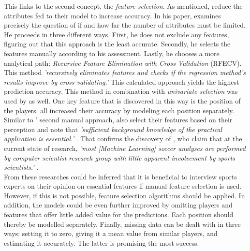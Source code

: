 \indent This links to the second concept, the \emph{feature selection}. As mentioned, \citet{deng_analysis_2020,egidi_bayesian_2018} reduce the attributes fed to their model to increase accuracy. In his paper, \citet{lutz_fantasy_2015} examines precisely the question of if and how far the number of attributes must be limited. He proceeds in three different ways. First, he does not exclude any features, figuring out that this approach is the least accurate. Secondly, he selects the features manually according to his assessment. Lastly, he chooses a more analytical path: \emph{Recursive Feature Elimination with Cross Validation} (RFECV). This method \emph{'recursively eliminates features and checks if the regression method's results improve by cross-validating.'} \parencite[, p. 4]{lutz_fantasy_2015} This calculated approach yields the highest prediction accuracy. This method in combination with \emph{univariate selection} was used by \citet{anik_players_2018} as well. One key feature that is discovered in this way is the position of the players. \citet{lutz_fantasy_2015,demediuk_performance_2021,egidi_bayesian_2018} all increased their accuracy by modeling each position separately. Similar to \citeauthor{lutz_fantasy_2015}' second manual approach, \citeauthor{deng_analysis_2020} also select their features based on their perception and note that \emph{'sufficient background knowledge of the practical application is essential.'} \parencite[, p. 4]{deng_analysis_2020}. That confirms the discovery of \citeauthor{rein_big_2016}, who claim that at the current state of research, \emph{'most [Machine Learning] soccer analyses are performed by computer scientist research group with little apparent involvement by sports scientists.'} \parencite[, p. 6]{rein_big_2016}. \\
\indent From these researches could be inferred that it is beneficial to interview sports experts on their opinion on essential features if manual feature selection is used. However, if this is not possible, feature selection algorithms should be applied. In addition, the models could be even further improved by omitting players and features that offer little added value for the predictions. Each position should thereby be modelled separately. Finally, missing data can be dealt with in three ways: setting it to zero, giving it a mean value from similar players, and estimating it accurately. The latter is promising the most success.

